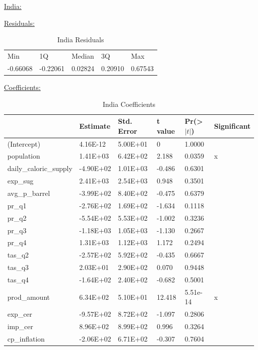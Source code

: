 \documentclass[11pt]{article}
\begin{document}
\begin{center}\underline{India:} \end{center}
\underline{Residuals:}
\FloatBarrier
\begin{table}[!htbp]
\centering
\begin{tabular}{lllll}
Min      & 1Q       & Median  & 3Q      & Max     \\
-0.66068 & -0.22061 & 0.02824 & 0.20910 & 0.67543
\end{tabular}
\caption{India Residuals}
\label{table13}
\end{table}
\FloatBarrier

\underline{Coefficients:}
\FloatBarrier
\begin{table}[!htbp]
\centering
\begin{tabular}{llllll}
\hline
                       & Estimate  & Std. Error & t value & Pr(\textgreater$|t|$) & Significant \\ \hline
(Intercept)            & 4.16E-12  & 5.00E+01   & 0       & 1.0000              &             \\
population             & 1.41E+03  & 6.42E+02   & 2.188   & 0.0359              & x           \\
daily\_caloric\_supply & -4.90E+02 & 1.01E+03   & -0.486  & 0.6301              &             \\
exp\_sug               & 2.41E+03  & 2.54E+03   & 0.948   & 0.3501              &             \\
avg\_p\_barrel         & -3.99E+02 & 8.40E+02   & -0.475  & 0.6379              &             \\
pr\_q1                 & -2.76E+02 & 1.69E+02   & -1.634  & 0.1118              &             \\
pr\_q2                 & -5.54E+02 & 5.53E+02   & -1.002  & 0.3236              &             \\
pr\_q3                 & -1.18E+03 & 1.05E+03   & -1.130  & 0.2667              &             \\
pr\_q4                 & 1.31E+03  & 1.12E+03   & 1.172   & 0.2494              &             \\
tas\_q2                & -2.57E+02 & 5.92E+02   & -0.435  & 0.6667              &             \\
tas\_q3                & 2.03E+01  & 2.90E+02   & 0.070   & 0.9448              &             \\
tas\_q4                & -1.64E+02 & 2.40E+02   & -0.682  & 0.5001              &             \\
prod\_amount           & 6.34E+02  & 5.10E+01   & 12.418  & 5.51e-14            & x           \\
exp\_cer               & -9.57E+02 & 8.72E+02   & -1.097  & 0.2806              &             \\
imp\_cer               & 8.96E+02  & 8.99E+02   & 0.996   & 0.3264              &             \\
cp\_inflation          & -2.06E+02 & 6.71E+02   & -0.307  & 0.7604              &            \\ \hline
\end{tabular}
\caption{India Coefficients}
\label{table14}
\end{table}
\end{document}
